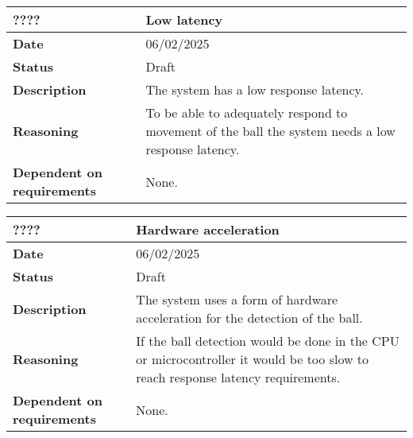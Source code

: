 \documentclass{article}
\begin{document}
\begin{table}[H]
    \renewcommand{\arraystretch}{1.3}
    \begin{tabular}{|l|p{10cm}|}
        \hline
        \rowcolor{gray!50}
        \textbf{????} & \textbf{Low latency} \\ \hline
        \textbf{Date} & 06/02/2025 \\ \hline
        \textbf{Status} & Draft \\ \hline
        \textbf{Description} & The system has a low response latency. \\ \hline
        \textbf{Reasoning} & To be able to adequately respond to movement of the ball the system needs a low response latency. \\ \hline
        \textbf{Dependent on requirements} & None. \\ \hline
    \end{tabular}
\end{table}

\begin{table}[H]
    \renewcommand{\arraystretch}{1.3}
    \begin{tabular}{|l|p{10cm}|}
        \hline
        \rowcolor{gray!50}
        \textbf{????} & \textbf{Hardware acceleration} \\ \hline
        \textbf{Date} & 06/02/2025 \\ \hline
        \textbf{Status} & Draft \\ \hline
        \textbf{Description} & The system uses a form of hardware acceleration for the detection of the ball. \\ \hline
        \textbf{Reasoning} & If the ball detection would be done in the CPU or microcontroller it would be too slow to reach response latency requirements. \\ \hline
        \textbf{Dependent on requirements} & None. \\ \hline
    \end{tabular}
\end{table}
\end{document}
